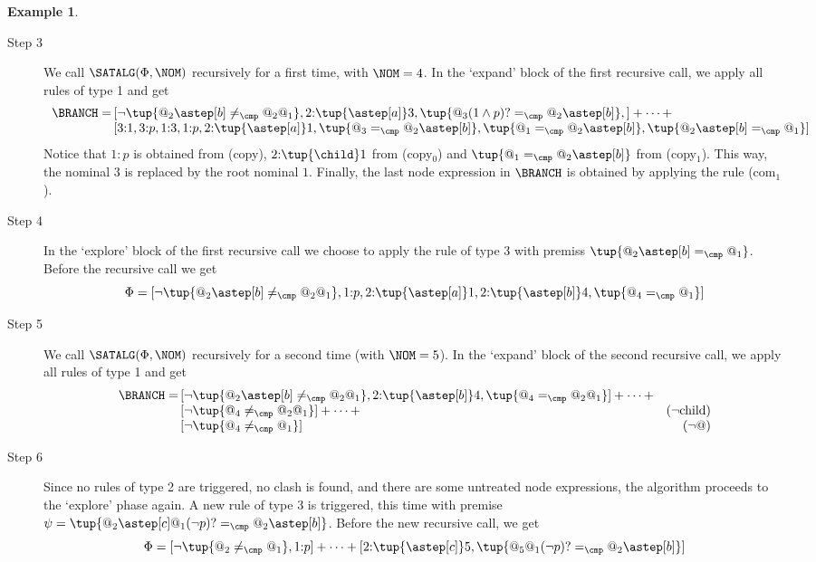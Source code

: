 \documentclass[10pt,a4paper]{amsart}
\theoremstyle{definition}
\newtheorem{exa}[thm]{Example}
\theoremstyle{remark}
\begin{document}
\begin{exa}
\begin{description}
  \item[Step 3] 
    We call $\SATALG(\Phi,\NOM)$ recursively for a first time, with $\NOM=4$. 
    In the `expand' block of the first recursive call, we apply all rules of type 1 and get
    \[
      \begin{array}{r@{\,}@{}lr}
        \BRANCH = 
          &
          [
            \neg\tup{@_2\astep[b]\neq_\cmp @_2@_1},
            2{:}\tup{\astep[a]}3,
            \tup{@_3(1\land p)? =_\cmp @_2\astep[b]},
          ] + \dots + \\
          &
          [
            3{:}1,3{:}p,1{:}3,1{:}p, 2{:}\tup{\astep[a]}1,
            \tup{@_3 =_\cmp @_2\astep[b]},
            \tup{@_1 =_\cmp @_2\astep[b]},
            \tup{@_2\astep[b]=_\cmp@_1}
          ]
      \end{array}
    \]
    Notice that $1{:}p$ is obtained from (copy), $2{:}\tup{\child}1$ from (copy$_0$) and $\tup{@_1=_\cmp @_2\astep[b]}$ from (copy$_1$). 
    This way, the nominal $3$ is replaced by the root nominal $1$.
    Finally, the last node expression in $\BRANCH$ is obtained by applying the rule (com$_1$).

  \item[Step 4]
    In the `explore' block of the first recursive call we choose to apply the rule of type 3 with premiss $\tup{@_2\astep[b]=_\cmp@_1}$.
    Before the recursive call we get
    \[
      \Phi =
        [
          \neg\tup{@_2\astep[b]\neq_\cmp @_2@_1}, 1{:}p, 2{:}\tup{\astep[a]}1, 2{:}\tup{\astep[b]}4, \tup{@_4 =_{\cmp} @_1}
        ]
    \]

  \item[Step 5]
    We call $\SATALG(\Phi,\NOM)$ recursively for a second time (with $\NOM=5$).
    In the `expand' block of the second recursive call, we apply all rules of type 1 and get
    \[
      \begin{array}{r@{\,}@{}lr}
        \BRANCH = 
            &
            [
              \neg\tup{@_2\astep[b]\neq_\cmp @_2@_1},
              2{:}\tup{\astep[b]}4,
              \tup{@_4 =_{\cmp} @_2@_1}
            ] + \dots + \\
            &
            [
              \neg \tup{@_4 \neq_{\cmp} @_2@_1}
            ] + \dots +
              & \text{($\lnot$child)} \\
            &
            [
              \neg \tup{@_4 \neq_{\cmp} @_1}
            ]
              & \text{($\neg@$)}
      \end{array}
    \]
        

  \item[Step 6] 
    Since no rules of type 2 are triggered, no clash is found, and there are some untreated node expressions, the algorithm proceeds to the `explore' phase again. A new rule of type 3 is triggered, this time with premise $\psi= \tup{@_2\astep[c]@_1(\neg p)? =_\cmp @_2\astep[b]}$. Before the new recursive call, we get
    \[
      \Phi =
        [
          \neg\tup{@_2\neq_{\cmp}@_1}, 1{:}p
        ] 
        + \dots + 
        [
          2{:}\tup{\astep[c]}5, \tup{@_5@_1(\neg p)? =_\cmp @_2\astep[b]} 
        ]
    \]



\end{description}
\end{exa}
\end{document}

